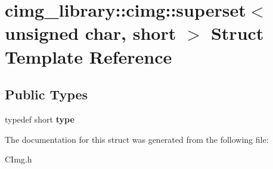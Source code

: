 \hypertarget{structcimg__library_1_1cimg_1_1superset_3_01unsigned_01char_00_01short_01_4}{\section{cimg\-\_\-library\-:\-:cimg\-:\-:superset$<$ unsigned char, short $>$ Struct Template Reference}
\label{structcimg__library_1_1cimg_1_1superset_3_01unsigned_01char_00_01short_01_4}
}
\subsection*{Public Types}
\begin{DoxyCompactItemize}
\item 
\hypertarget{structcimg__library_1_1cimg_1_1superset_3_01unsigned_01char_00_01short_01_4_a68d34127850cd741b86e351d4719a8c3}{typedef short {\bfseries type}}\label{structcimg__library_1_1cimg_1_1superset_3_01unsigned_01char_00_01short_01_4_a68d34127850cd741b86e351d4719a8c3}

\end{DoxyCompactItemize}


The documentation for this struct was generated from the following file\-:\begin{DoxyCompactItemize}
\item 
C\-Img.\-h\end{DoxyCompactItemize}
